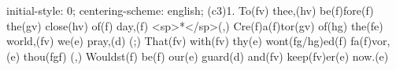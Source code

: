 initial-style: 0;
centering-scheme: english;
(c3)1. To(fv) thee,(hv) be(f)fore(f) the(gv) close(hv) of(f) day,(f) <sp>*</sp>(,)
Cre(f)a(f)tor(gv) of(hg) the(fe) world,(fv) we(e) pray,(d) (;)
That(fv) with(fv) thy(e) wont(fg/hg)ed(f) fa(f)vor,(e) thou(fgf) (,)
Wouldst(f) be(f) our(e) guard(d) and(fv) keep(fv)er(e) now.(e)